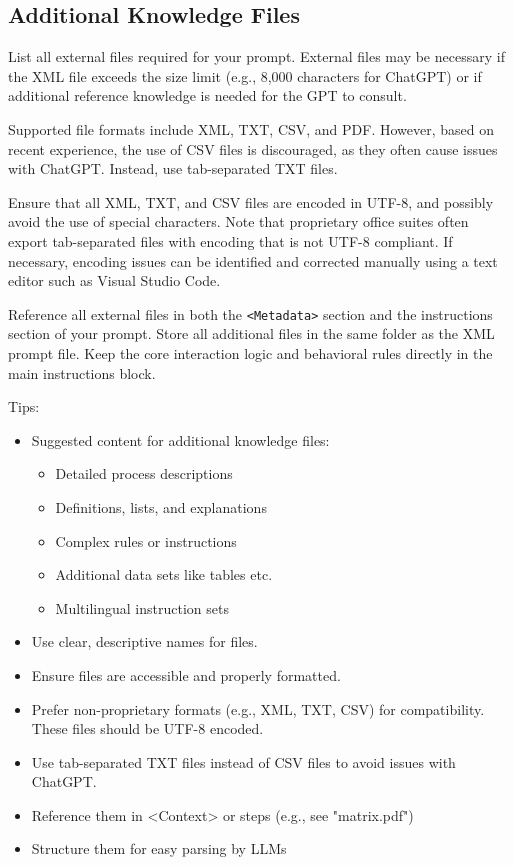 \documentclass[a4paper,11pt]{refart}
\begin{document}
\subsection{Additional Knowledge Files}\label{sec:additional-knowledge-files}
List all external files required for your prompt. External files may be necessary if the XML file exceeds the size limit (e.g., 8,000 characters for ChatGPT) or if additional reference knowledge is needed for the GPT to consult.

Supported file formats include XML, TXT, CSV, and PDF. However, based on recent experience, the use of CSV files is discouraged, as they often cause issues with ChatGPT. Instead, use tab-separated TXT files.

Ensure that all XML, TXT, and CSV files are encoded in UTF-8, and possibly avoid the use of special characters. Note that proprietary office suites often export tab-separated files with encoding that is not UTF-8 compliant. If necessary, encoding issues can be identified and corrected manually using a text editor such as Visual Studio Code.

Reference all external files in both the \lstinline!<Metadata>! section and the instructions section of your prompt. Store all additional files in the same folder as the XML prompt file. Keep the core interaction logic and behavioral rules directly in the main instructions block.

Tips:
\begin{itemize}
  \item Suggested content for additional knowledge files:
  \begin{itemize}
    \item Detailed process descriptions
    \item Definitions, lists, and explanations
    \item Complex rules or instructions
    \item Additional data sets like tables etc.
    \item Multilingual instruction sets  
  \end{itemize}
  \item Use clear, descriptive names for files.
  \item Ensure files are accessible and properly formatted.
  \item Prefer non-proprietary formats (e.g., XML, TXT, CSV) for compatibility. These files should be UTF-8 encoded.
  \item Use tab-separated TXT files instead of CSV files to avoid issues with ChatGPT.
  \item Reference them in <Context> or steps (e.g., see "matrix.pdf")
  \item Structure them for easy parsing by LLMs
\end{itemize}
  
\end{document}
